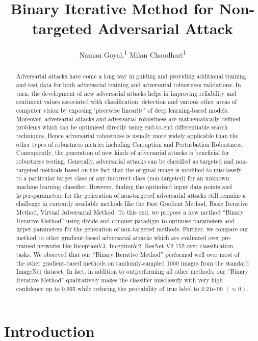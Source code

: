 \documentclass[letterpaper]{article}
\title{Binary Iterative Method for Non-targeted Adversarial Attack}
\author{
    Naman Goyal,\textsuperscript{\rm 1}
    Milan Chaudhari\textsuperscript{\rm 1}\\
}
\begin{document}
\maketitle

\begin{abstract}
Adversarial attacks have come a long way in guiding and providing additional training and test data for both adversarial training and adversarial robustness validations. In turn, the development of new adversarial attacks helps in improving reliability and sentiment values associated with classification, detection and various other areas of computer vision by exposing ‘piecewise linearity’ of deep learning-based models. Moreover, adversarial attacks and adversarial robustness are mathematically defined problems which can be optimised directly using end-to-end differentiable search techniques. Hence adversarial robustness is usually more widely applicable than the other types of robustness metrics including Corruption and Perturbation Robustness. Consequently, the generation of new kinds of adversarial attacks is beneficial for robustness testing. Generally, adversarial attacks can be classified as targeted and non-targeted methods based on the fact that the original image is modified to misclassify to a particular target class or any-incorrect class (non-targeted) for an unknown machine learning classifier. However, finding the optimized input data points and hyper-parameters for the generation of non-targeted adversarial attacks still remains a challenge in currently available methods like the Fast Gradient Method, Basic Iterative Method, Virtual Adversarial Method. To this end, we propose a new method “Binary Iterative Method” using divide-and-conquer paradigm to optimise parameters and hyper-parameters for the generation of non-targeted methods. Further, we compare our method to other gradient-based adversarial attacks which are evaluated over pre-trained networks like InceptionV3, InceptionV2, ResNet V2 152 over classification tasks. We observed that our “Binary Iterative Method” performed well over most of the other gradient-based methods on randomly-sampled 1000 images from the standard ImageNet dataset. In fact, in addition to outperforming all other methods,  our “Binary Iterative Method” qualitatively makes the classifier misclassify with very high confidence up to 0.995 while reducing the probability of true label to 2.21e-09 $(\approx 0)$.
\end{abstract}


\section{Introduction}
\end{document}
